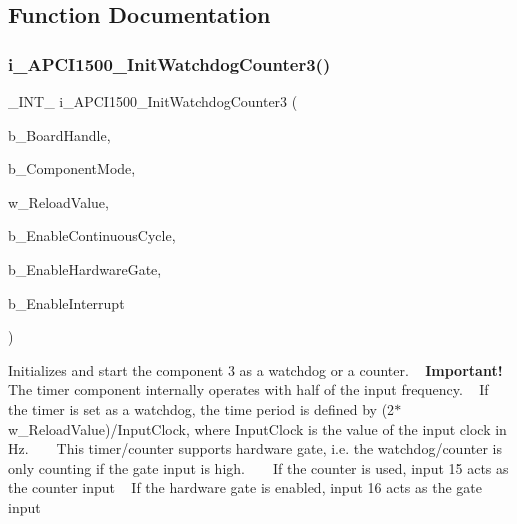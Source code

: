 \subsection{Function Documentation}
\mbox{\label{group___timer3_cmp_d_l_l_ga7dbe3d3d6971b8f52a027e3f4aaaf9c9}} 
\subsubsection{\texorpdfstring{i\_APCI1500\_InitWatchdogCounter3()}{i\_APCI1500\_InitWatchdogCounter3()}}
{\footnotesize\ttfamily \+\_\+\+I\+N\+T\+\_\+ i\+\_\+\+A\+P\+C\+I1500\+\_\+\+Init\+Watchdog\+Counter3 (\begin{DoxyParamCaption}\item[{B\+Y\+T\+E\+\_\+}]{b\+\_\+\+Board\+Handle,  }\item[{B\+Y\+T\+E\+\_\+}]{b\+\_\+\+Component\+Mode,  }\item[{L\+O\+N\+G\+\_\+}]{w\+\_\+\+Reload\+Value,  }\item[{B\+Y\+T\+E\+\_\+}]{b\+\_\+\+Enable\+Continuous\+Cycle,  }\item[{B\+Y\+T\+E\+\_\+}]{b\+\_\+\+Enable\+Hardware\+Gate,  }\item[{B\+Y\+T\+E\+\_\+}]{b\+\_\+\+Enable\+Interrupt }\end{DoxyParamCaption})}

Initializes and start the component 3 as a watchdog or a counter. ~\newline
 {\bfseries{Important!}} The timer component internally operates with half of the input frequency. ~\newline
 If the timer is set as a watchdog, the time period is defined by (2$\ast$w\+\_\+\+Reload\+Value)/\+Input\+Clock, where Input\+Clock is the value of the input clock in Hz. ~\newline
 ~\newline
 This timer/counter supports hardware gate, i.\+e. the watchdog/counter is only counting if the gate input is high. ~\newline
 ~\newline
 If the counter is used, input 15 acts as the counter input ~\newline
 If the hardware gate is enabled, input 16 acts as the gate input ~\newline
 
